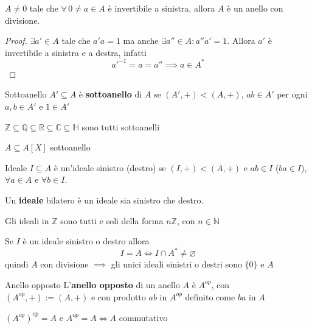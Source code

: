 \begin{remark}
    \(A \neq 0\) tale che \(\forall \, 0 \neq a \in A\) è invertibile a sinistra,
    allora \(A\) è un anello con divisione.
\end{remark}
\begin{proof}
    \(\exists a' \in A\) tale che \(a' a = 1\) ma anche \(\exists a'' \in A :
    a''a' = 1\). Allora \(a'\) è invertibile a sinistra e a destra, infatti
    \[
      a'^{-1} = a = a'' \implies a \in A^{*}
    \]
\end{proof}
\begin{definition}{Sottoanello}
    \(A' \subseteq A \) è \textbf{sottoanello} di \(A\) se \({(A', +)} < {(A, +)} \), \(ab \in A' \) per ogni \(a, b \in A'\) e \(1 \in A'\) 
\end{definition}
\begin{example}{}
    \(\mathbb{Z} \subseteq \mathbb{Q} \subseteq \mathbb{R} \subseteq \mathbb{C} \subseteq \mathbb{H}    \) sono tutti sottoanelli
\end{example}
\begin{example}{}
    \(A \subseteq A[X] \) sottoanello
\end{example}

\begin{definition}{Ideale}
    \(I \subseteq A \) è un'ideale sinistro (destro) se \({(I, +)} < {(A, +)}\)
    e \(ab \in I\) (\(ba \in I\)), \(\forall a \in A\) e \(\forall b \in I\).

    Un \textbf{ideale} bilatero è un ideale sia sinistro che destro.
\end{definition}

\begin{example}{}
    Gli ideali in \(\mathbb{Z}\) sono tutti e soli della forma \(n \mathbb{Z}\),
    con \(n \in \mathbb{N}\) 
\end{example}
\begin{remark}{}
    Se \(I\) è un ideale sinistro o destro allora
    \[
      I = A \iff I \cap A^{*} \neq \varnothing
    \]
    quindi \(A\) con divisione \(\implies \) gli unici ideali sinistri o destri
    sono \(\{0\} \) e \(A\) 
\end{remark}
\begin{definition}{Anello opposto}
    L'\textbf{anello opposto} di un anello \(A\) è \(A^{op}\), con \({(A^{op}, +)} := {(A, +)}\) e con prodotto \(ab\) in \(A^{op}\) definito come \(ba\) in \(A\) 
\end{definition}
\begin{remark}{}
    \({(A^{op})}^{op} = A\) e \(A^{op} = A \iff A\) commutativo
\end{remark}

